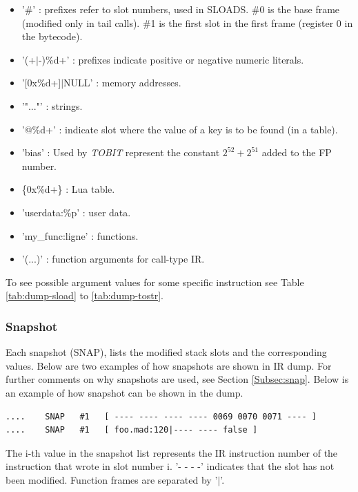 \begin{itemize}
\begin{itemize}
      \item '\#' : prefixes refer to slot numbers, used in SLOADS.
        \#0 is the base frame (modified only in tail calls).
        \#1 is the first slot in the first frame (register 0 in
        the bytecode).
      \item '(+$\vert$-)\%d+' : prefixes indicate positive or negative numeric literals.
      \item '[0x\%d+]$\vert$NULL' : memory addresses.
      \item '"..."' : strings.
      \item '@\%d+' : indicate slot where the value of a key is to be found (in a table).
      \item 'bias' : Used by \emph{TOBIT} represent the constant
        $2^{52}+2^{51}$ added to the FP number.
      \item \{0x\%d+\} : Lua table.
      \item 'userdata:\%p' : user data.
      \item 'my\_func:ligne' : functions.
      \item '(...)' : function arguments for call-type IR.
    \end{itemize}
    To see possible argument values for some specific instruction see Table
    \ref{tab:dump-sload} to \ref{tab:dump-tostr}.
\end{itemize}


\subsubsection{Snapshot}
Each snapshot (SNAP), lists the modified stack slots and the corresponding values.
Below are two examples of how snapshots are shown in IR dump. For further
comments on why snapshots are used, see Section \ref{Subsec:snap}. Below is an
example of how snapshot can be shown in the dump.
\begin{verbatim}
....    SNAP   #1   [ ---- ---- ---- ---- 0069 0070 0071 ---- ]
....    SNAP   #1   [ foo.mad:120|---- ---- false ]
\end{verbatim}
The i-th value in the snapshot list represents the IR instruction number of the
instruction that wrote in slot number i. '- - - -' indicates that the slot
has not been modified. Function frames are separated by '$\vert$'.


